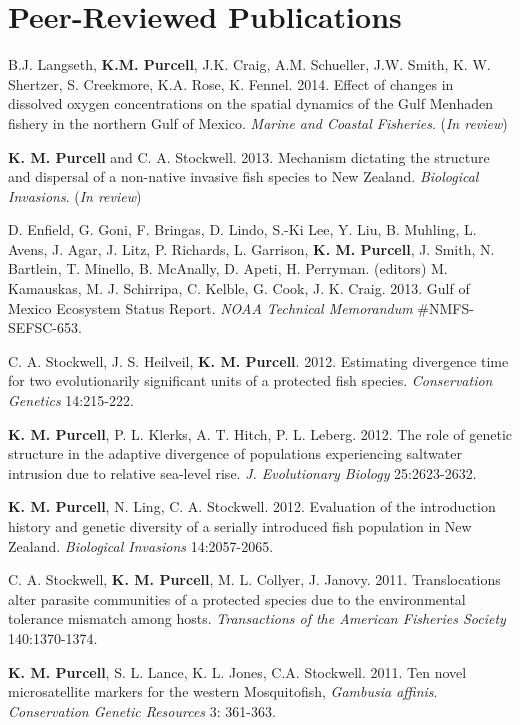 \documentclass[letterpaper]{article}
\renewenvironment{itemize}{
  \begin{list}{}{
    \setlength{\leftmargin}{1em}
  }
}{
  \end{list}
}
\begin{document}
\section*{Peer-Reviewed Publications}
	\begin{itemize}
		\item B.J. Langseth, \textbf{K.M. Purcell}, J.K. Craig, A.M. Schueller, J.W. Smith, K. W. Shertzer, S. Creekmore, K.A. Rose, K. Fennel. 2014. Effect of changes in dissolved oxygen concentrations on the spatial dynamics of the Gulf Menhaden fishery in the northern Gulf of Mexico. \textit{Marine and Coastal Fisheries}. (\textit{In review})
		\item \textbf{K. M. Purcell} and C. A. Stockwell. 2013. Mechanism dictating the structure and dispersal of a non-native invasive fish species to New Zealand. \textit{Biological Invasions}. (\textit{In review})
		\item D. Enfield, G. Goni, F. Bringas, D. Lindo, S.-Ki Lee, Y. Liu, B. Muhling, L. Avens, J. Agar, J. Litz, P. Richards, L. Garrison, \textbf{K. M. Purcell}, J. Smith, N. Bartlein, T. Minello, B. McAnally, D. Apeti, H. Perryman. (editors) M. Kamauskas, M. J. Schirripa, C. Kelble, G. Cook, J. K. Craig. 2013. Gulf of Mexico Ecosystem Status Report. \textit{NOAA Technical Memorandum} #NMFS-SEFSC-653.
		\item C. A. Stockwell, J. S. Heilveil, \textbf{K. M. Purcell}. 2012. Estimating divergence time for two evolutionarily significant units of a protected fish species. \textit{Conservation Genetics} 14:215-222.
		\item \textbf{K. M. Purcell}, P. L. Klerks, A. T. Hitch, P. L. Leberg. 2012. The role of genetic structure in the adaptive divergence of populations experiencing saltwater intrusion due to relative sea-level rise. \textit{J. Evolutionary Biology} 25:2623-2632.
		\item \textbf{K. M. Purcell}, N. Ling, C. A. Stockwell. 2012. Evaluation of the introduction history and genetic diversity of a serially introduced fish population in New Zealand. \textit{Biological Invasions} 14:2057-2065.
		\item C. A. Stockwell, \textbf{K. M. Purcell}, M. L. Collyer, J. Janovy. 2011. Translocations alter parasite communities of a protected species due to the environmental tolerance mismatch among hosts. \textit{Transactions of the American Fisheries Society} 140:1370-1374.
		\item \textbf{K. M. Purcell}, S. L. Lance, K. L. Jones, C.A. Stockwell. 2011. Ten novel microsatellite markers for the western Mosquitofish, \textit{Gambusia affinis}. \textit{Conservation Genetic Resources} 3: 361-363.

\end{itemize}
\end{document}
